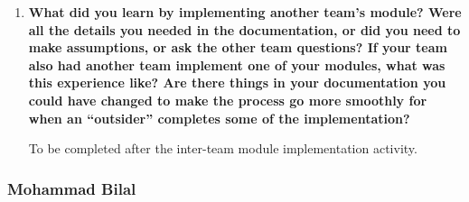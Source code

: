\documentclass[10pt, titlepage]{article}
\begin{document}
\begin{enumerate}
    \item \textbf{What did
    you learn by implementing another team's module? Were all the details you
    needed in the documentation, or did you need to make assumptions, or ask
    the other team questions? If your team also had another team implement one
    of your modules, what was this experience like? Are there things in your
    documentation you could have changed to make the process go more smoothly
    for when an ``outsider'' completes some of the implementation?}

    To be completed after the inter-team module implementation activity.

\end{enumerate}

\subsubsection*{Mohammad Bilal}
\end{document}
